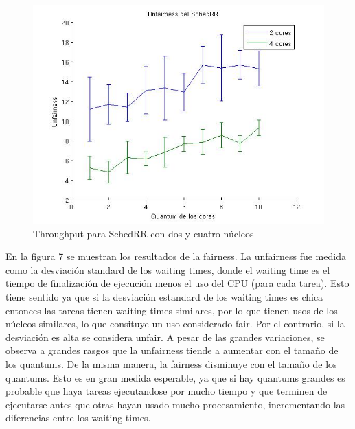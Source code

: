   \begin{figure}
  \includegraphics[scale=0.6]{images/fair.jpg}
  \caption{Throughput para SchedRR con dos y cuatro n\'ucleos}
  \end{figure}
  
  En la figura 7 se muestran los resultados de la fairness. La unfairness fue medida como la desviaci\'on standard de los waiting times, donde el waiting time es el tiempo de finalizaci\'on de ejecuci\'on menos el uso del CPU (para cada tarea).
  Esto tiene sentido ya que si la desviaci\'on estandard de los waiting times es chica entonces las tareas tienen waiting times similares, por lo que tienen usos de los n\'ucleos similares, lo que consituye un uso considerado fair.
  Por el contrario, si la desviaci\'on es alta se considera unfair. A pesar de las grandes variaciones, se observa a grandes rasgos que la unfairness tiende a aumentar con el tama\~no de los quantums. De la misma manera,
  la fairness disminuye con el tama\~no de los quantums. Esto es en gran medida esperable, ya que si hay quantums grandes es probable que haya tareas ejecutandose por mucho tiempo y que terminen de ejecutarse antes que otras hayan usado
  mucho procesamiento, incrementando las diferencias entre los waiting times.